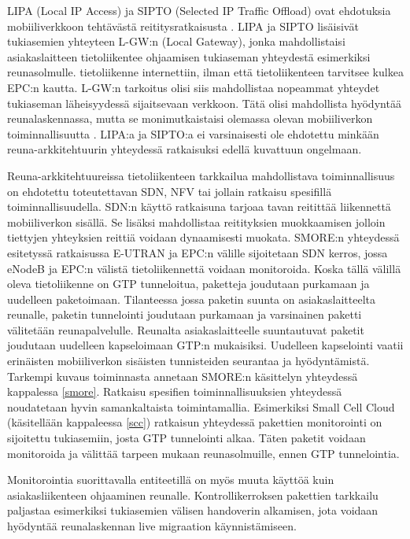 LIPA (Local IP Access) ja SIPTO (Selected IP Traffic Offload) ovat ehdotuksia mobiiliverkkoon tehtävästä reititysratkaisusta \cite{samdanis2012traffic,3gpplipa}.
LIPA ja SIPTO lisäisivät tukiasemien yhteyteen L-GW:n (Local Gateway), jonka mahdollistaisi asiakaslaitteen tietoliikentee ohjaamisen tukiaseman yhteydestä esimerkiksi reunasolmulle. tietoliikenne internettiin, ilman että tietoliikenteen tarvitsee kulkea EPC:n kautta. 
L-GW:n tarkoitus olisi siis mahdollistaa nopeammat yhteydet tukiaseman läheisyydessä sijaitsevaan verkkoon. Tätä olisi mahdollista hyödyntää reunalaskennassa, mutta se monimutkaistaisi olemassa olevan mobiiliverkon toiminnallisuutta \cite{cho2014smore}.
LIPA:a ja SIPTO:a ei varsinaisesti ole ehdotettu minkään reuna-arkkitehtuurin yhteydessä ratkaisuksi edellä kuvattuun ongelmaan. 

Reuna-arkkitehtuureissa tietoliikenteen tarkkailua mahdollistava toiminnallisuus on ehdotettu toteutettavan SDN, NFV tai jollain ratkaisu spesifillä toiminnallisuudella. 
SDN:n käyttö ratkaisuna tarjoaa tavan reitittää liikennettä mobiiliverkon sisällä. Se lisäksi mahdollistaa reitityksien muokkaamisen jolloin tiettyjen yhteyksien reittiä voidaan dynaamisesti muokata. SMORE:n yhteydessä esitetyssä ratkaisussa  E-UTRAN ja EPC:n välille sijoitetaan SDN kerros, jossa eNodeB ja EPC:n välistä tietoliikennettä voidaan monitoroida. 
Koska tällä välillä oleva tietoliikenne on GTP tunneloitua, paketteja joudutaan purkamaan ja uudelleen paketoimaan. 
Tilanteessa jossa paketin suunta on asiakaslaitteelta reunalle, paketin tunnelointi joudutaan purkamaan ja varsinainen paketti välitetään reunapalvelulle. 
Reunalta asiakaslaitteelle suuntautuvat paketit joudutaan uudelleen kapseloimaan GTP:n mukaisiksi.
Uudelleen kapselointi vaatii erinäisten mobiiliverkon sisäisten tunnisteiden seurantaa ja hyödyntämistä.
Tarkempi kuvaus toiminnasta annetaan SMORE:n käsittelyn yhteydessä kappalessa \ref{smore}.
Ratkaisu spesifien toiminnallisuuksien yhteydessä noudatetaan hyvin samankaltaista toimintamallia. Esimerkiksi Small Cell Cloud (käsitellään kappaleessa \ref{scc}) ratkaisun yhteydessä pakettien monitorointi on sijoitettu tukiasemiin, josta GTP tunnelointi alkaa. Täten paketit voidaan monitoroida ja välittää tarpeen mukaan reunasolmuille, ennen GTP tunnelointia.

Monitorointia suorittavalla entiteetillä on myös muuta käyttöä kuin asiakasliikenteen ohjaaminen reunalle. Kontrollikerroksen pakettien tarkkailu paljastaa esimerkiksi tukiasemien välisen handoverin alkamisen, jota voidaan hyödyntää reunalaskennan live migraation käynnistämiseen.

